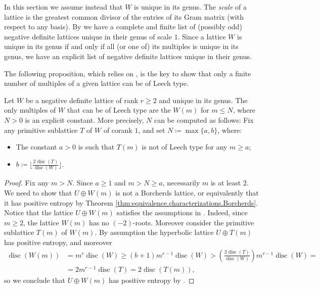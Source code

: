 \documentclass[11pt,letterpaper]{amsart}
\DeclareMathOperator{\disc}{disc}
\begin{document}
In this section we assume instead that $W$ is unique in its genus. The \emph{scale} of a lattice is the greatest common divisor of the entries of its Gram matrix (with respect to any basis). By \cite{voight, lorch.kirschmer.single.class} we have a complete and finite list of (possibly odd) negative definite lattices unique in their genus of scale $1$. 
Since a lattice $W$ is unique in its genus if and only if all (or one of) its multiples is unique in its genus, we have an explicit list of negative definite lattices unique in their genus.

The following proposition, which relies on \cite[Theorem 4.6]{mezzedimi.entropy}, is the key to show that only a finite number of multiples of a given lattice can be of Leech type.

\begin{proposition} \label{prop:bound.multiples}
Let $W$ be a negative definite lattice of rank $r\ge 2$ and unique in its genus. The only multiples of $W$ that can be of Leech type are the $W(m)$ for $m \le N$, where $N>0$ is an explicit constant.
More precisely, $N$ can be computed as follows: Fix any primitive sublattice $T$ of $W$ of corank $1$, and set $N\coloneqq \max\{a,b\}$, where:
\begin{itemize}
    \item The constant $a>0$ is such that $T(m)$ is not of Leech type for any $m\ge a$;
    \item $b\coloneqq \lfloor \frac{2\disc(T)}{\disc(W)} \rfloor$.
\end{itemize}
\end{proposition}
\begin{proof}
Fix any $m>N$. Since $a\ge 1$ and $m>N\ge a$, necessarily $m$ is at least $2$.
We need to show that $U\oplus W(m)$ is not a Borcherds lattice, or equivalently that it has positive entropy by Theorem \ref{thm:equivalence.characterizations.Borcherds}.
Notice that the lattice $U\oplus W(m)$ satisfies the assumptions in \cite[Theorem 4.6]{mezzedimi.entropy}. Indeed, since $m\ge 2$, the lattice $W(m)$ has no $(-2)$-roots.
Moreover consider the primitive sublattice $T(m)$ of $W(m)$. By assumption the hyperbolic lattice $U\oplus T(m)$ has positive entropy, and moreover
\begin{equation*}
\begin{split}
    \disc(W(m)) &=m^r \disc(W) \ge (b+1)m^{r-1}\disc(W) > \left( \frac{2\disc(T)}{\disc(W)}\right)   m^{r-1}\disc(W) = \\
    &=2m^{r-1}\disc(T)=2\disc(T(m)),
\end{split}
\end{equation*}
so we conclude that $U\oplus W(m)$ has positive entropy by \cite[Theorem 4.6]{mezzedimi.entropy}.
\end{proof}
\end{document}
